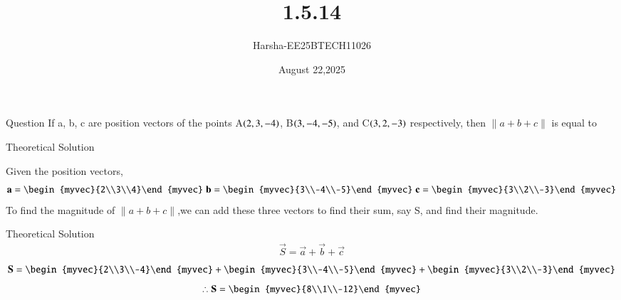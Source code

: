 \documentclass{beamer}
\title %
{1.5.14}
\date{August 22,2025}
\author %
{Harsha-EE25BTECH11026}
\begin{document}
\frame{\titlepage}
\begin{frame}{Question}
If a, b, c are position vectors of the points A$\left(2, 3, -4\right)$, B$\left(3, -4, -5\right)$, and C$\left(3, 2, -3\right)$ respectively, then $\|a + b + c\|$ is equal to
\end{frame}



\begin{frame}{Theoretical Solution}

Given the position vectors,
\begin{align}
    \vec{a}=\begin{myvec}{2\\3\\4}\end{myvec}\;
    \vec{b}=\begin{myvec}{3\\-4\\-5}\end{myvec}\;
    \vec{c}=\begin{myvec}{3\\2\\-3}\end{myvec}
\end{align}
To find the magnitude of $\|a+b+c\|$,we can add these three vectors to find their sum, say S, and find their magnitude.

\end{frame}

\begin{frame}{Theoretical Solution}
\begin{align}
    \vec{S}=\vec{a}+\vec{b}+\vec{c}
\end{align}
\begin{align}
    \vec{S}=\begin{myvec}{2\\3\\-4}\end{myvec}+\begin{myvec}{3\\-4\\-5}\end{myvec}+\begin{myvec}{3\\2\\-3}\end{myvec}
\end{align}
\begin{align}
    \therefore\vec{S}=\begin{myvec}{8\\1\\-12}\end{myvec}
\end{align}
\end{frame}
\end{document}
